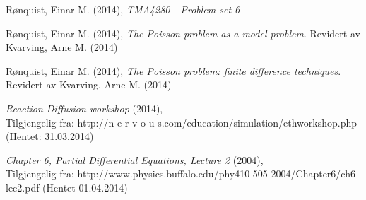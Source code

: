 \begin{thebibliography}{9}

	Rønquist, Einar M. (2014),
	\emph{TMA4280 - Problem set 6}

	Rønquist, Einar M. (2014),
	\emph{The Poisson problem as a model problem}.
	Revidert av Kvarving, Arne M. (2014)

	Rønquist, Einar M. (2014),
	\emph{The Poisson problem: finite difference techniques}.
	Revidert av Kvarving, Arne M. (2014)

	\emph{Reaction-Diffusion workshop} (2014),\\
	Tilgjengelig fra: http://n-e-r-v-o-u-s.com/education/simulation/ethworkshop.php
	(Hentet: 31.03.2014)

	\emph{Chapter 6, Partial Differential Equations, Lecture 2} (2004),\\
	Tilgjengelig fra: http://www.physics.buffalo.edu/phy410-505-2004/Chapter6/ch6-lec2.pdf
	(Hentet 01.04.2014)
\end{thebibliography}
